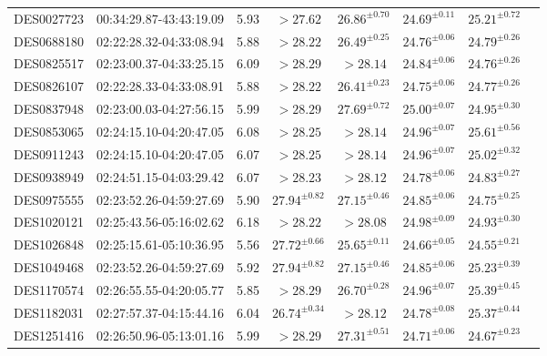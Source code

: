 {\begin{ThreePartTable}
\begin{longtable}{lccccccl}
DES0027723 & 00:34:29.87-43:43:19.09 & 5.93 & $> 27.62$ & $26.86^{ \pm 0.70}$ & $24.69^{ \pm 0.11}$ & $25.21^{ \pm 0.72}$ & \\
DES0688180 & 02:22:28.32-04:33:08.94 & 5.88 & $> 28.22$ & $26.49^{ \pm 0.25}$ & $24.76^{ \pm 0.06}$ & $24.79^{ \pm 0.26}$ & \tnote{a} \\
DES0825517 & 02:23:00.37-04:33:25.15 & 6.09 & $> 28.29$ & $> 28.14$ & $24.84^{ \pm 0.06}$ & $24.76^{ \pm 0.26}$ & \\
DES0826107 & 02:22:28.33-04:33:08.91 & 5.88 & $> 28.22$ & $26.41^{ \pm 0.23}$ & $24.75^{ \pm 0.06}$ & $24.77^{ \pm 0.26}$ & \tnote{a} \\
DES0837948 & 02:23:00.03-04:27:56.15 & 5.99 & $> 28.29$ & $27.69^{ \pm 0.72}$ & $25.00^{ \pm 0.07}$ & $24.95^{ \pm 0.30}$ & \\
DES0853065 & 02:24:15.10-04:20:47.05 & 6.08 & $> 28.25$ & $> 28.14$ & $24.96^{ \pm 0.07}$ & $25.61^{ \pm 0.56}$ & \tnote{b,} \enspace \tnote{f} \\
DES0911243 & 02:24:15.10-04:20:47.05 & 6.07 & $> 28.25$ & $> 28.14$ & $24.96^{ \pm 0.07}$ & $25.02^{ \pm 0.32}$ & \tnote{b,} \enspace \tnote{f} \\
DES0938949 & 02:24:51.15-04:03:29.42 & 6.07 & $> 28.23$ & $> 28.12$ & $24.78^{ \pm 0.06}$ & $24.83^{ \pm 0.27}$ & \tnote{g,} \enspace \tnote{i} \\
DES0975555 & 02:23:52.26-04:59:27.69 & 5.90 & $27.94^{ \pm 0.82}$ & $27.15^{ \pm 0.46}$ & $24.85^{ \pm 0.06}$ & $24.75^{ \pm 0.25}$ & \tnote{c} \\
DES1020121 & 02:25:43.56-05:16:02.62 & 6.18 & $> 28.22$ & $> 28.08$ & $24.98^{ \pm 0.09}$ & $24.93^{ \pm 0.30}$ & \\
DES1026848 & 02:25:15.61-05:10:36.95 & 5.56 & $27.72^{ \pm 0.66}$ & $25.65^{ \pm 0.11}$ & $24.66^{ \pm 0.05}$ & $24.55^{ \pm 0.21}$ & \\
DES1049468 & 02:23:52.26-04:59:27.69 & 5.92 & $27.94^{ \pm 0.82}$ & $27.15^{ \pm 0.46}$ & $24.85^{ \pm 0.06}$ & $25.23^{ \pm 0.39}$ & \tnote{c} \\
DES1170574 & 02:26:55.55-04:20:05.77 & 5.85 & $> 28.29$ & $26.70^{ \pm 0.28}$ & $24.96^{ \pm 0.07}$ & $25.39^{ \pm 0.45}$ & \\
DES1182031 & 02:27:57.37-04:15:44.16 & 6.04 & $26.74^{ \pm 0.34}$ & $> 28.12$ & $24.78^{ \pm 0.08}$ & $25.37^{ \pm 0.44}$ & \\
DES1251416 & 02:26:50.96-05:13:01.16 & 5.99 & $> 28.29$ & $27.31^{ \pm 0.51}$ & $24.71^{ \pm 0.06}$ & $24.67^{ \pm 0.23}$ & \\

\end{longtable}
\end{ThreePartTable}}
